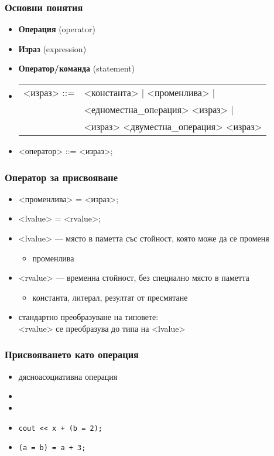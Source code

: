 \documentclass{beamer}
\begin{document}
\begin{frame}
  \frametitle{Основни понятия}

  \begin{itemize}
  \item \textbf{Операция} (operator)
  \item \textbf{Израз} (expression)
  \item \textbf{Оператор/команда} (statement)
  \item{}
    \begin{tabular}[t]{@{}rl@{}}
      <израз> ::= &<константа> | <променлива> |\\
      &<едноместна\_опeрация> <израз> |\\
      &<израз> <двуместна\_операция> <израз>
    \end{tabular}
  \item{} <оператор> ::= <израз>\tta;
  \end{itemize}
\end{frame}

\begin{frame}
  \frametitle{Оператор за присвояване}

  \begin{itemize}[<+->]
  \item{} <променлива> \tta= <израз>\tta;
  \item{} <lvalue> \tta= <rvalue>\tta;
  \item{} <lvalue> --- място в паметта със стойност, която може да се променя
    \begin{itemize}[<.->]
    \item  \exa променлива
  \end{itemize}
  \item{} <rvalue> --- временна стойност, без специално място в паметта
    \begin{itemize}[<.->]
    \item \exa константа, литерал, резултат от пресмятане
  \end{itemize}
  \item стандартно преобразуване на типовете:\\
    <rvalue> се преобразува до типа на <lvalue>
  \end{itemize}

\end{frame}

\begin{frame}
  \frametitle{Присвояването като операция}
  \begin{itemize}
  \item<1-> \alert{дясноасоциативна} операция
  \item<2-> 
  \item<3> 
  \item<5-> \exa \lstinline{cout << x + (b = 2);}
  \item<6-> \exa \lstinline{(a = b) = a + 3;}
  \end{itemize}
\end{frame}
\end{document}
